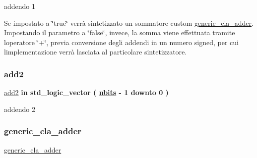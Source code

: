 addendo 1 

Se impostato a \char`\"{}true\char`\"{} verrà sintetizzato un sommatore custom \hyperlink{classgeneric__cla__adder}{generic\+\_\+cla\+\_\+adder}. Impostando il parametro a \char`\"{}false\char`\"{}, invece, la somma viene effettuata tramite l\textquotesingle{}operatore \char`\"{}+\char`\"{}, previa conversione degli addendi in un numero signed, per cui l\textquotesingle{}implementazione verrà lasciata al particolare sintetizzatore. \mbox{\label{group___adder_gabf87ad241134c4d313c708910677575e}} 
\subsubsection{\texorpdfstring{add2}{add2}}
{\footnotesize\ttfamily \hyperlink{group___adder_gabf87ad241134c4d313c708910677575e}{add2} {\bfseries \textcolor{vhdlchar}{in}\textcolor{vhdlchar}{ }} {\bfseries \textcolor{vhdlchar}{std\+\_\+logic\+\_\+vector}\textcolor{vhdlchar}{ }\textcolor{vhdlchar}{(}\textcolor{vhdlchar}{ }\textcolor{vhdlchar}{ }\textcolor{vhdlchar}{ }\textcolor{vhdlchar}{ }{\bfseries \hyperlink{group___adder_gae1435c07d0cd54b521535e2f8de6f94e}{nbits}} \textcolor{vhdlchar}{-\/}\textcolor{vhdlchar}{ } \textcolor{vhdldigit}{1} \textcolor{vhdlchar}{ }\textcolor{vhdlchar}{downto}\textcolor{vhdlchar}{ }\textcolor{vhdlchar}{ } \textcolor{vhdldigit}{0} \textcolor{vhdlchar}{ }\textcolor{vhdlchar}{)}\textcolor{vhdlchar}{ }} \hspace{0.3cm}{\ttfamily [Port]}}



addendo 2 

\mbox{\label{group___adder_gae7148956d4ef1d1cd14f35060634b9c3}} 
\subsubsection{\texorpdfstring{generic\+\_\+cla\+\_\+adder}{generic\_cla\_adder}}
{\footnotesize\ttfamily \hyperlink{group___adder_gae7148956d4ef1d1cd14f35060634b9c3}{generic\+\_\+cla\+\_\+adder} {\bfseries \textcolor{vhdlchar}{ }} \hspace{0.3cm}{\ttfamily [Component]}}

\mbox{\label{group___adder_gae1435c07d0cd54b521535e2f8de6f94e}} 
